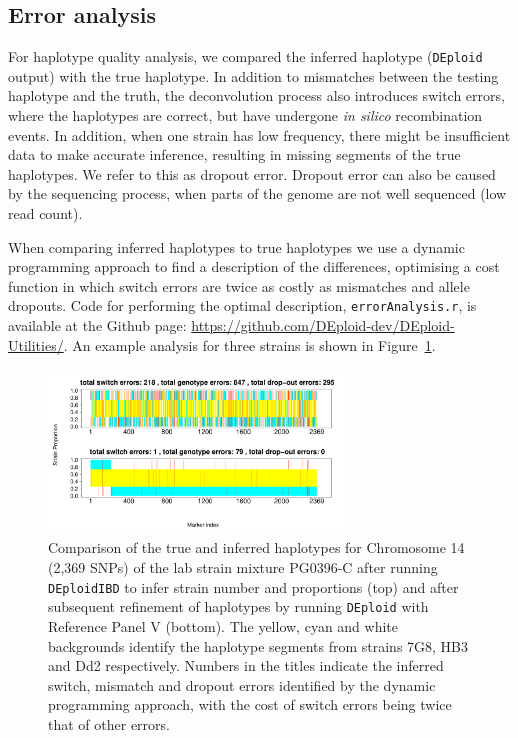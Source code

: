 \documentclass[9pt]{article}
\begin{document}
\subsection{Error analysis}

For haplotype quality analysis, we compared the inferred haplotype ({\tt DEploid} output) with the true haplotype. In addition to mismatches between the testing haplotype and the truth, the deconvolution process also introduces switch errors, where the haplotypes are correct, but have undergone {\it in silico} recombination events. In addition, when one strain has low frequency, there might be insufficient data to make accurate inference, resulting in missing segments of the true haplotypes. We refer to this as dropout error. Dropout error can also be caused by the sequencing process, when parts of the genome are not well sequenced (low read count).

When comparing inferred haplotypes to true haplotypes we use a dynamic programming approach to find a description of the differences, optimising a cost function in which switch errors are twice as costly as mismatches and allele dropouts.  Code for performing the optimal description, {\tt errorAnalysis.r}, is available at the Github page:  \url{https://github.com/DEploid-dev/DEploid-Utilities/}.  An example analysis for three strains is shown in Figure~\ref{fig:error}.



\begin{figure}[htp]
  \centering
    \includegraphics[width=0.7\textwidth]{DEploid_IBD_haps_compare.pdf}
  \caption{Comparison of the true and inferred haplotypes for Chromosome 14 (2,369 SNPs) of the lab strain mixture PG0396-C after running \texttt{DEploidIBD} to infer strain number and proportions (top) and after subsequent refinement of haplotypes by running \texttt{DEploid} with Reference Panel V (bottom).  The yellow, cyan and white backgrounds identify the haplotype segments from strains 7G8, HB3 and Dd2 respectively. Numbers in the titles indicate the inferred switch, mismatch and dropout errors identified by the dynamic programming approach, with the cost of switch errors being twice that of other errors.
  }
  \label{fig:error}
\end{figure}
\end{document}
